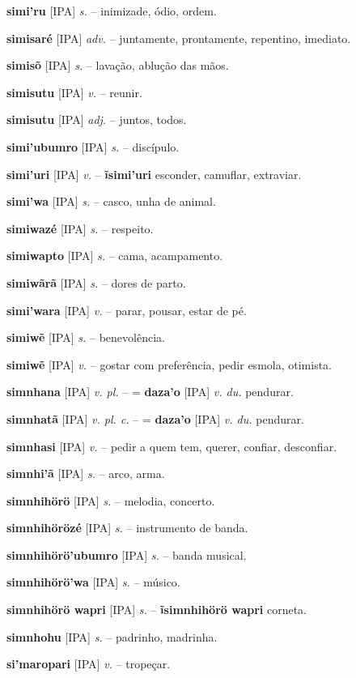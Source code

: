 \textbf{simi'ru} [IPA] \textit{s.} -- inimizade, ódio, ordem.

\textbf{simisaré} [IPA] \textit{adv.} -- juntamente, prontamente, repentino, imediato.

\textbf{simisõ} [IPA] \textit{s.} -- lavação, ablução das mãos.

\textbf{simisutu} [IPA] \textit{v.} -- reunir.

\textbf{simisutu} [IPA] \textit{adj.} -- juntos, todos.

\textbf{simi'ubumro} [IPA] \textit{s.} -- discípulo.

\textbf{simi'uri} [IPA] \textit{v.} -- \textbf{ĩsimi'uri} esconder, camuflar, extraviar.

\textbf{simi'wa} [IPA] \textit{s.} -- casco, unha de animal.

\textbf{simiwazé} [IPA] \textit{s.} -- respeito.

\textbf{simiwapto} [IPA] \textit{s.} -- cama, acampamento.

\textbf{simiwãrã} [IPA] \textit{s.} -- dores de parto.

\textbf{simi'wara} [IPA] \textit{v.} -- parar, pousar, estar de pé.

\textbf{simiwẽ} [IPA] \textit{s.} -- benevolência.

\textbf{simiwẽ} [IPA] \textit{v.} -- gostar com preferência, pedir esmola, otimista.

\textbf{simnhana} [IPA] \textit{v. pl.} -- = \textbf{daza'o} [IPA] \textit{v. du.} pendurar.

\textbf{simnhatã} [IPA] \textit{v. pl. c.} -- = \textbf{daza'o} [IPA] \textit{v. du.} pendurar.

\textbf{simnhasi} [IPA] \textit{v.} -- pedir a quem tem, querer, confiar, desconfiar.

\textbf{simnhi'ã} [IPA] \textit{s.} -- arco, arma.

\textbf{simnhihörö} [IPA] \textit{s.} -- melodia, concerto.

\textbf{simnhihörözé} [IPA] \textit{s.} -- instrumento de banda.

\textbf{simnhihörö'ubumro} [IPA] \textit{s.} -- banda musical.

\textbf{simnhihörö'wa} [IPA] \textit{s.} -- músico.

\textbf{simnhihörö wapri} [IPA] \textit{s.} -- \textbf{ĩsimnhihörö wapri} corneta.

\textbf{simnhohu} [IPA] \textit{s.} -- padrinho, madrinha.

\textbf{si'maropari} [IPA] \textit{v.} -- tropeçar.

